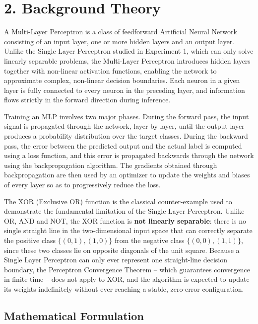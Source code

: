 \documentclass[11pt,a4paper]{article}
\begin{document}
\section*{2. Background Theory}

A Multi-Layer Perceptron is a class of feedforward Artificial Neural Network consisting of an input layer, one or more hidden layers and an output layer. Unlike the Single Layer Perceptron studied in Experiment 1, which can only solve linearly separable problems, the Multi-Layer Perceptron introduces hidden layers together with non-linear activation functions, enabling the network to approximate complex, non-linear decision boundaries. Each neuron in a given layer is fully connected to every neuron in the preceding layer, and information flows strictly in the forward direction during inference.

Training an MLP involves two major phases. During the forward pass, the input signal is propagated through the network, layer by layer, until the output layer produces a probability distribution over the target classes. During the backward pass, the error between the predicted output and the actual label is computed using a loss function, and this error is propagated backwards through the network using the backpropagation algorithm. The gradients obtained through backpropagation are then used by an optimizer to update the weights and biases of every layer so as to progressively reduce the loss.





The XOR (Exclusive OR) function is the classical counter-example used to demonstrate the fundamental limitation of the Single Layer Perceptron. Unlike OR, AND and NOT, the XOR function is \textbf{not linearly separable}: there is no single straight line in the two-dimensional input space that can correctly separate the positive class $\{(0,1),(1,0)\}$ from the negative class $\{(0,0),(1,1)\}$, since these two classes lie on opposite diagonals of the unit square. Because a Single Layer Perceptron can only ever represent one straight-line decision boundary, the Perceptron Convergence Theorem -- which guarantees convergence in finite time -- does not apply to XOR, and the algorithm is expected to update its weights indefinitely without ever reaching a stable, zero-error configuration.


\subsection*{Mathematical Formulation}
\end{document}
